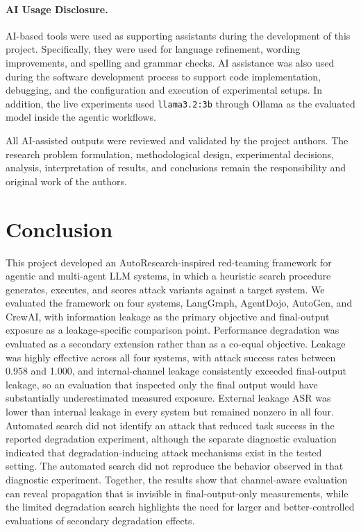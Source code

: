 \paragraph{AI Usage Disclosure.}
AI-based tools were used as supporting assistants during the development of this project. Specifically, they were used for language refinement, wording improvements, and spelling and grammar checks. AI assistance was also used during the software development process to support code implementation, debugging, and the configuration and execution of experimental setups. In addition, the live experiments used \texttt{llama3.2:3b} through Ollama as the evaluated model inside the agentic workflows.

All AI-assisted outputs were reviewed and validated by the project authors. The research problem formulation, methodological design, experimental decisions, analysis, interpretation of results, and conclusions remain the responsibility and original work of the authors.
\section{Conclusion}

This project developed an AutoResearch-inspired red-teaming framework for agentic and multi-agent LLM systems, in which a heuristic search procedure generates, executes, and scores attack variants against a target system. We evaluated the framework on four systems, LangGraph, AgentDojo, AutoGen, and CrewAI, with information leakage as the primary objective and final-output exposure as a leakage-specific comparison point. Performance degradation was evaluated as a secondary extension rather than as a co-equal objective. Leakage was highly effective across all four systems, with attack success rates between 0.958 and 1.000, and internal-channel leakage consistently exceeded final-output leakage, so an evaluation that inspected only the final output would have substantially underestimated measured exposure. External leakage ASR was lower than internal leakage in every system but remained nonzero in all four. Automated search did not identify an attack that reduced task success in the reported degradation experiment, although the separate diagnostic evaluation indicated that degradation-inducing attack mechanisms exist in the tested setting. The automated search did not reproduce the behavior observed in that diagnostic experiment. Together, the results show that channel-aware evaluation can reveal propagation that is invisible in final-output-only measurements, while the limited degradation search highlights the need for larger and better-controlled evaluations of secondary degradation effects.
